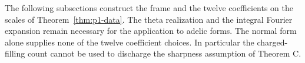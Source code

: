 The following subsections construct the frame and the twelve coefficients on the scales of Theorem~\ref{thm:p1-data}. The theta realization and the integral Fourier expansion remain necessary for the application to adelic forms. The normal form alone supplies none of the twelve coefficient choices. In particular the charged-filling count cannot be used to discharge the sharpness assumption of Theorem C.




